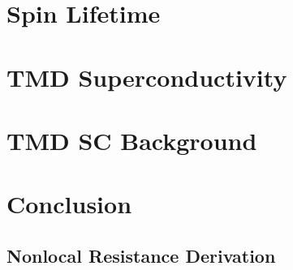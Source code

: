 \documentclass[oneside,12pt]{memoir}
\begin{document}
  \frontmatter{}
  
  
  
  \pagestyle{thesis}
  
  
  
  \newpage
  \tableofcontents
  \newpage
  \listoffigures
  \mainmatter{}
  

  \chapter{Spin Lifetime}
  
  
  
  

  \chapter{TMD Superconductivity}
  
  
  
  
  

  \chapter{TMD SC Background}
  
  
  
  
  
  
  
  

  \chapter{Conclusion}
  

  \begin{appendices}
    \chapter{Nonlocal Resistance Derivation}
    
  \end{appendices}
  \backmatter{}
  \SingleSpacing{}
  \printbibliography{}
\end{document}
